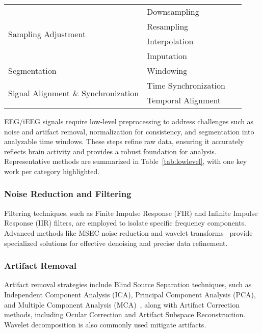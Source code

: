 \begin{table}[]
\begin{tabular}{p{80pt}p{90pt}p{30pt}}
\hline
\multirow{4}{80pt}{Sampling Adjustment} 
                            & Downsampling         & ~\cite{mousavi2019deep} \\
                            & Resampling           & ~\cite{ZHANG2020105089} \\
                            & Interpolation        & ~\cite{SZ27} \\
                            & Imputation           & ~\cite{sharma2021dephnn} \\
\hline
\multirow{1}{80pt}{Segmentation} 
                            & Windowing            & ~\cite{seal2021deprnet} \\
\hline
\multirow{2}{80pt}{Signal Alignment \& Synchronization} 
                            & Time Synchronization & ~\cite{iwama2023two} \\
                            & Temporal Alignment   & ~\cite{iwama2023two} \\
\hline
\end{tabular}
\end{table}


EEG/iEEG signals require low-level preprocessing to address challenges such as noise and artifact removal, normalization for consistency, and segmentation into analyzable time windows.
These steps refine raw data, ensuring it accurately reflects brain activity and provides a robust foundation for analysis.
Representative methods are summarized in Table~\ref{tab:lowlevel}, with one key work per category highlighted.

\subsubsection{Noise Reduction and Filtering}
Filtering techniques, such as Finite Impulse Response (FIR) and Infinite Impulse Response (IIR) filters, are employed to isolate specific frequency components. Advanced methods like MSEC noise reduction and wavelet transforms~\cite{ay2019automated} provide specialized solutions for effective denoising and precise data refinement.

\subsubsection{Artifact Removal} 
Artifact removal strategies include Blind Source Separation techniques, such as Independent Component Analysis (ICA), Principal Component Analysis (PCA), and Multiple Component Analysis (MCA)~\cite{9047940}, along with Artifact Correction methods, including Ocular Correction and Artifact Subspace Reconstruction. Wavelet decomposition is also commonly used mitigate artifacts.

